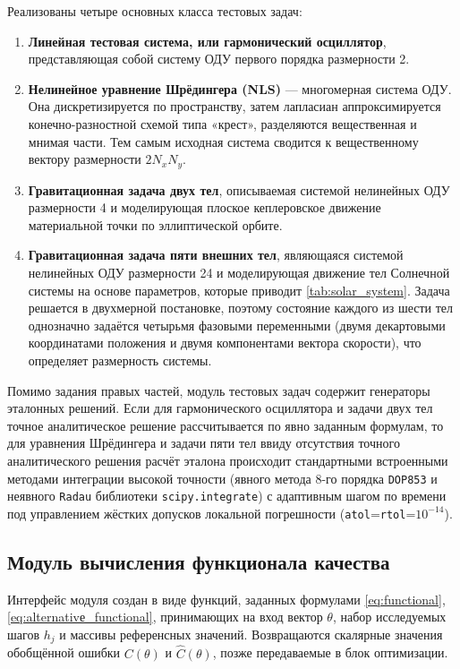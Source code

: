 Реализованы четыре основных класса тестовых задач:
\begin{enumerate}
	\item \textbf{Линейная тестовая система, или гармонический осциллятор}, представляющая собой систему ОДУ первого порядка размерности 2. 
	\item \textbf{Нелинейное уравнение Шрёдингера (NLS)} — многомерная система ОДУ. Она дискретизируется по пространству, затем лапласиан аппроксимируется конечно-разностной схемой типа «крест», разделяются вещественная и мнимая части. Тем самым исходная система сводится к вещественному вектору размерности $2 N_x N_y$. 
	\item \textbf{Гравитационная задача двух тел}, описываемая системой нелинейных ОДУ размерности 4 и моделирующая плоское кеплеровское движение материальной точки по эллиптической орбите.
	\item \textbf{Гравитационная задача пяти внешних тел}, являющаяся системой нелинейных ОДУ размерности 24 и моделирующая движение тел Солнечной системы на основе параметров, которые приводит \autoref{tab:solar_system}. Задача решается в двухмерной постановке, поэтому состояние каждого из шести тел однозначно задаётся четырьмя фазовыми переменными (двумя декартовыми координатами положения и двумя компонентами вектора скорости), что определяет размерность системы.
\end{enumerate}

Помимо задания правых частей, модуль тестовых задач содержит генераторы эталонных решений. Если для гармонического осциллятора и задачи двух тел точное аналитическое решение рассчитывается по явно заданным формулам, то для уравнения Шрёдингера и задачи пяти тел ввиду отсутствия точного аналитического решения расчёт эталона происходит стандартными встроенными методами интеграции высокой точности (явного метода 8-го порядка \texttt{DOP853} и неявного \texttt{Radau} библиотеки \texttt{scipy.integrate}) с адаптивным шагом по времени под управлением жёстких допусков локальной погрешности (\texttt{atol}=\texttt{rtol}=$10^{-14}$). 
		
\subsection{Модуль вычисления функционала качества}
Интерфейс модуля создан в виде функций, заданных формулами \eqref{eq:functional}, \eqref{eq:alternativе_functional}, принимающих на вход вектор $\theta$, набор исследуемых шагов $h_j$ и массивы референсных значений. Возвращаются скалярные значения обобщённой ошибки $C(\theta)$ и $\hat{C}(\theta)$, позже передаваемые в блок оптимизации.

